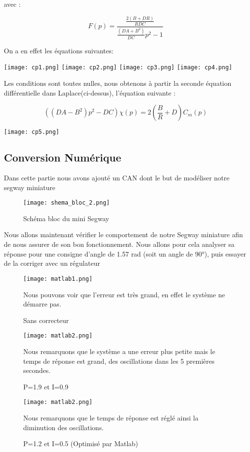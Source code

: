 \documentclass[oneside,a4paper,12pt]{article}
\begin{document}
	avec :
	
	$$ F(p) = \frac{\frac{2(B+DR)}{RDC}}{\frac{(DA+B^{2})}{DC}p^{2}-1} $$
	
	On a en effet les équations suivantes:
	
	
	\texttt{[image: cp1.png]}
	\texttt{[image: cp2.png]}
	\texttt{[image: cp3.png]}
	\texttt{[image: cp4.png]}
	
	Les conditions sont toutes nulles, nous obtenons à partir la seconde équation différentielle dans Laplace(ci-dessus), l’équation suivante : 
	
	$$ ((DA-B^{2})p^{2}-DC)\chi(p) = 2(\frac{B}{R}+D)C_{m}(p) $$
	
	\texttt{[image: cp5.png]}
	
	\subsection{Conversion Numérique}
	
	Dans cette partie nous avons ajouté un CAN dont le but de modéliser notre segway miniature
	
	\begin{figure}[h]
		\centering
		\texttt{[image: shema\_bloc\_2.png]}
		\caption{Schéma bloc du mini Segway}
	\end{figure}
	
	Nous allons maintenant vérifier le comportement de notre Segway miniature afin de nous assurer de son bon fonctionnement. Nous allons pour cela analyser sa réponse pour une consigne d’angle de 1.57 rad (soit un angle de 90°), puis essayer de la corriger avec un régulateur
	
	\begin{figure}[h]
		\begingroup
		\centering
		\texttt{[image: matlab1.png]}
		\caption{Sans correcteur}
		\endgroup
		\vspace{0.5cm}
		Nous pouvons voir que l’erreur est très grand, en effet le système ne démarre pas.
	\end{figure}
	\begin{figure}[h]
		\begingroup
		\centering
		\texttt{[image: matlab2.png]}
		\caption{P=1.9 et I=0.9}
		\endgroup
		\vspace{0.5cm}
		Nous remarquons que le système a une erreur plus petite mais le temps de réponse est grand, des oscillations dans les 5 premières secondes.
	\end{figure}
	\begin{figure}[t]
		\begingroup
		\centering
		\texttt{[image: matlab2.png]}
		\caption{P=1.2 et I=0.5 (Optimisé par Matlab)}
		\endgroup
		\vspace{0.5cm}
		Nous remarquons que le temps de réponse est réglé ainsi la diminution des oscillations.
	\end{figure}
\end{document}
